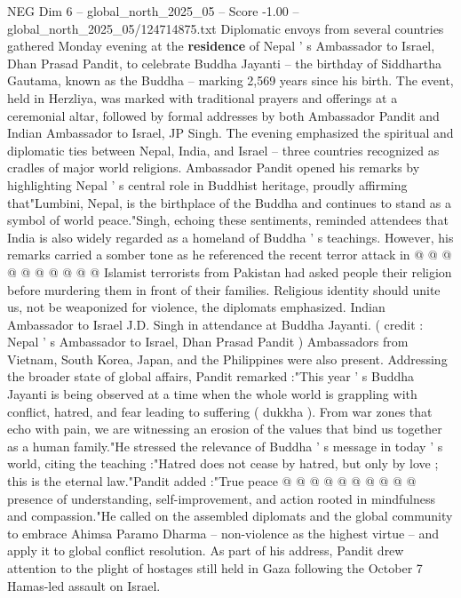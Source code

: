\begin{textsample}{NEG Dim 6 – global\_north\_2025\_05 – Score -1.00 – global\_north\_2025\_05/124714875.txt}  \label{ex:f6_neg_411}
Diplomatic envoys from several countries gathered Monday evening at the \textbf{residence} of Nepal ' s Ambassador to Israel, Dhan Prasad Pandit, to celebrate Buddha Jayanti -- the birthday of Siddhartha Gautama, known as the Buddha -- marking 2,569 years since his birth.
The event, held in Herzliya, was marked with traditional prayers and offerings at a ceremonial altar, followed by formal addresses by both Ambassador Pandit and Indian Ambassador to Israel, JP Singh.
The evening emphasized the spiritual and diplomatic ties between Nepal, India, and Israel -- three countries recognized as cradles of major world religions.
Ambassador Pandit opened his remarks by highlighting Nepal ' s central role in Buddhist heritage, proudly affirming that"Lumbini, Nepal, is the birthplace of the Buddha and continues to stand as a symbol of world peace."Singh, echoing these sentiments, reminded attendees that India is also widely regarded as a homeland of Buddha ' s teachings.
However, his remarks carried a somber tone as he referenced the recent terror attack in @ @ @ @ @ @ @ @ @ @ Islamist terrorists from Pakistan had asked people their religion before murdering them in front of their families.
Religious identity should unite us, not be weaponized for violence, the diplomats emphasized.
Indian Ambassador to Israel J.D.
Singh in attendance at Buddha Jayanti. ( credit : Nepal ' s Ambassador to Israel, Dhan Prasad Pandit ) Ambassadors from Vietnam, South Korea, Japan, and the Philippines were also present.
Addressing the broader state of global affairs, Pandit remarked :"This year ' s Buddha Jayanti is being observed at a time when the whole world is grappling with conflict, hatred, and fear leading to suffering ( dukkha ).
From war zones that echo with pain, we are witnessing an erosion of the values that bind us together as a human family."He stressed the relevance of Buddha ' s message in today ' s world, citing the teaching :"Hatred does not cease by hatred, but only by love ; this is the eternal law."Pandit added :"True peace @ @ @ @ @ @ @ @ @ @ presence of understanding, self-improvement, and action rooted in mindfulness and compassion."He called on the assembled diplomats and the global community to embrace Ahimsa Paramo Dharma -- non-violence as the highest virtue -- and apply it to global conflict resolution.
As part of his address, Pandit drew attention to the plight of hostages still held in Gaza following the October 7 Hamas-led assault on Israel.

\end{textsample}
